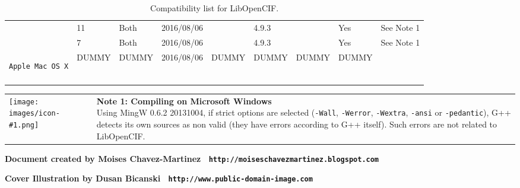 \documentclass[11pt,twoside,openany,x11names,svgnames]{memoir}
\makeatletter
\newcommand{\IconNote}[3]
{
	\begin{table}[ht]
	\begin{tabular}{ lm{\dimexpr\textwidth-8\tabcolsep-\wd0}@{}}
		\toprule
		\texttt{[image: images/icon-\#1.png]}
		&
		\parbox[t]{155mm}{
		\textbf{#2} \\
		#3
		}
	\end{tabular}
\end{table}
}
\makeatother
\begin{document}
{\begin{longtable}{| >{\bfseries}p{3cm} | p{2cm} | p{1cm} | p{2cm} | p{1.2cm} | p{1cm} | p{1cm} | p{1cm} | p{1.5cm} |}
	\multirow{2}{*}{\texttt{Microsoft Windows}}   & 11                             & Both   & 2016/08/06  &          & 4.9.3 &       & Yes   & See Note 1 \\

	                                              \cline{2-8}
	                                              & 7                              & Both   & 2016/08/06  &          & 4.9.3 &       & Yes   & See Note 1 \\
	                                              
	\hline
	
	\texttt{Apple Mac OS X}                       & DUMMY                          & DUMMY  & 2016/08/06  & DUMMY    & DUMMY & DUMMY & DUMMY &  \\
	
	\hline
\caption{Compatibility list for LibOpenCIF.}
\label{tab:Compatibility-list-for-LibOpenCIF}
\end{longtable}
}

\IconNote
	{warning}
	{Note 1: Compiling on Microsoft Windows}
	{Using MingW 0.6.2 20131004, if strict options are selected (\texttt{-Wall}, \texttt{-Werror}, \texttt{-Wextra}, \texttt{-ansi} or \texttt{-pedantic}), G++ detects its own sources as non valid (they have errors according to G++ itself). Such errors are not related to LibOpenCIF.}

\cleartoverso


\enlargethispage{3\baselineskip}
\thispagestyle{empty}
\pagecolor[HTML]{0E0407}

\begin{center}
\begin{minipage}{.8\textwidth}
\color{Cornsilk}\Large\bfseries

\end{minipage}
\end{center}


\begin{center}

\vspace*{\baselineskip}

\textbf{\textcolor{LightGoldenrod!50!Gold}{Document created by Moises Chavez-Martinez \textbullet\ \texttt{http://moiseschavezmartinez.blogspot.com}}}

\vspace*{\baselineskip}

\textbf{\textcolor{LightGoldenrod}{Cover Illustration by Dusan Bicanski \textbullet\ \texttt{http://www.public-domain-image.com}}}
\end{center}
\end{document}
